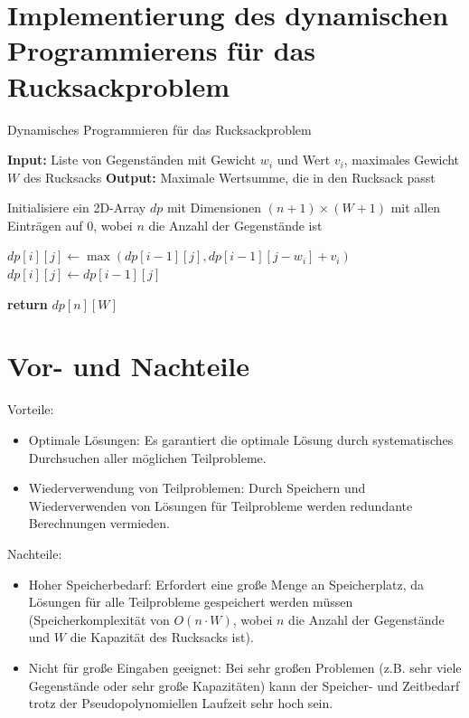 \documentclass[12pt]{report}
\begin{document}
\section{Implementierung des dynamischen Programmierens für das Rucksackproblem}
\begin{algorithm}
	\caption{Dynamisches Programmieren für das Rucksackproblem}
	\begin{algorithmic}[1]
		\State \textbf{Input:} Liste von Gegenständen mit Gewicht $w_i$ und Wert $v_i$, maximales Gewicht $W$ des Rucksacks
		\State \textbf{Output:} Maximale Wertsumme, die in den Rucksack passt
		
		\State Initialisiere ein 2D-Array $dp$ mit Dimensionen $(n+1) \times (W+1)$ mit allen Einträgen auf $0$, wobei $n$ die Anzahl der Gegenstände ist
		
		\State $dp[i][j] \gets \max(dp[i-1][j], dp[i-1][j-w_i] + v_i)$
		\Else
		\State $dp[i][j] \gets dp[i-1][j]$
		\EndIf
		\EndFor
		\EndFor
		
		\State \textbf{return} $dp[n][W]$
	\end{algorithmic}
\end{algorithm}


\section{Vor- und Nachteile}
Vorteile: 
\begin{itemize}
	\item Optimale Lösungen: Es garantiert die optimale Lösung durch systematisches Durchsuchen aller möglichen Teilprobleme.
	\item Wiederverwendung von Teilproblemen: Durch Speichern und Wiederverwenden von Lösungen für Teilprobleme werden redundante Berechnungen vermieden.
\end{itemize}

Nachteile:
\begin{itemize}
	\item Hoher Speicherbedarf: Erfordert eine große Menge an Speicherplatz, da Lösungen für alle Teilprobleme gespeichert werden müssen (Speicherkomplexität von $O(n \cdot W)$, wobei $n$ die Anzahl der Gegenstände und $W$ die Kapazität des Rucksacks ist).
	\item Nicht für große Eingaben geeignet: Bei sehr großen Problemen (z.B. sehr viele Gegenstände oder sehr große Kapazitäten) kann der Speicher- und Zeitbedarf trotz der Pseudopolynomiellen Laufzeit sehr hoch sein.
\end{itemize}
\end{document}
